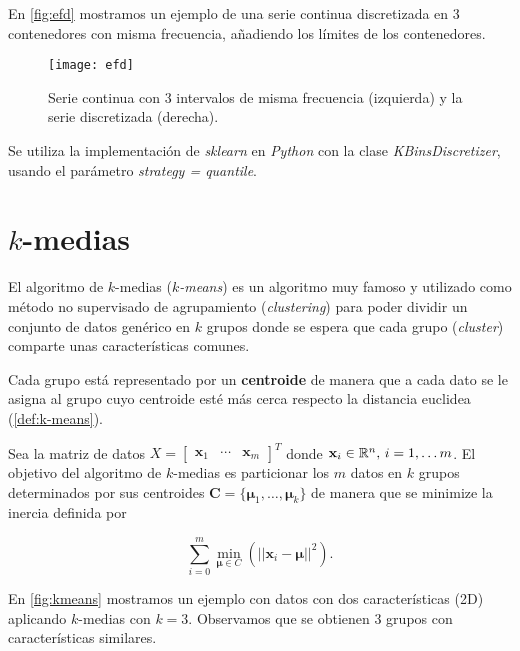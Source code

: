 En \autoref{fig:efd} mostramos un ejemplo de una serie continua discretizada en 3 contenedores con misma frecuencia, añadiendo los límites de los contenedores.

\begin{figure}[htpb]
  \centering
  \texttt{[image: efd]}
  \caption{Serie continua con 3 intervalos de misma frecuencia (izquierda) y la serie discretizada (derecha).}
  \label{fig:efd}
\end{figure}

Se utiliza la implementación de \emph{sklearn} en \emph{Python} con la clase \emph{KBinsDiscretizer}, usando el parámetro \emph{strategy = quantile}.

\section{$k$-medias}

El algoritmo de $k$-medias (\emph{$k$-means}) \cite{macqueen1967some} es un algoritmo muy famoso y utilizado como método no supervisado de agrupamiento (\emph{clustering}) para poder dividir un conjunto de datos genérico en $k$ grupos donde se espera que cada grupo (\emph{cluster}) comparte unas características comunes.

Cada grupo está representado por un \textbf{centroide} de manera que a cada dato se le asigna al grupo cuyo centroide esté más cerca respecto la distancia euclidea (\autoref{def:k-means}).

\begin{definicion}[$k$-medias]
  Sea la matriz de datos $X = \begin{bmatrix} \textbf{x}_1 & \cdots & \textbf{x}_m \end{bmatrix}^T$ donde $\textbf{x}_i \in \mathbb{R}^n, \, i = 1, \ldots m$. El objetivo del algoritmo de $k$-medias es particionar los $m$ datos en $k$ grupos determinados por sus centroides $\textbf{C} = \{\pmb{\mu}_1, \ldots, \pmb{\mu}_k\}$ de manera que se minimize la inercia definida por

  $$\sum \limits^m_{i = 0} \min \limits_{\pmb{\mu} \in C} \left(||\textbf{x}_i - \pmb\mu ||^2 \right).$$
  \label{def:k-means}
\end{definicion}

En \autoref{fig:kmeans} \cite{ruiz2018kmeans} mostramos un ejemplo con datos con dos características (2D) aplicando $k$-medias con $k = 3$. Observamos que se obtienen 3 grupos con características similares.

